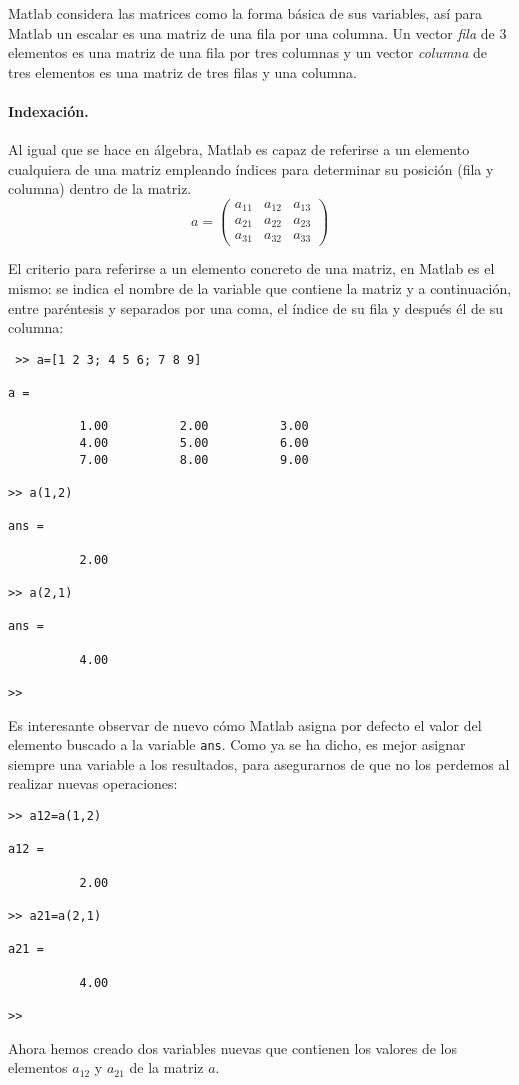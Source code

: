 Matlab considera las matrices como la forma básica de sus variables, así para Matlab un escalar es una matriz de una fila por una columna. Un vector \emph{fila} de 3 elementos es una matriz de una fila por tres columnas y un vector \emph{columna} de tres elementos es una matriz de tres filas y una columna.

\paragraph*{Indexación.} Al igual que se hace en álgebra, Matlab es capaz de referirse a un elemento cualquiera de una matriz empleando índices para determinar su posición (fila y columna) dentro de la matriz.
\begin{equation*}
a=
\begin{pmatrix}
a_{11}&a_{12}&a_{13}\\
a_{21}&a_{22}&a_{23}\\
a_{31}&a_{32}&a_{33}
\end{pmatrix}
\end{equation*}

El criterio para referirse a un elemento concreto de una matriz, en Matlab es el mismo: se indica el nombre de la variable que contiene la matriz y a continuación, entre paréntesis y separados por una coma, el índice de su fila y después él de su columna:
 \begin{verbatim}
 >> a=[1 2 3; 4 5 6; 7 8 9]

a =

          1.00          2.00          3.00
          4.00          5.00          6.00
          7.00          8.00          9.00

>> a(1,2)

ans =

          2.00

>> a(2,1)

ans =

          4.00

>> 
 \end{verbatim}
 
Es interesante observar de nuevo cómo Matlab asigna por defecto el valor del elemento buscado a la variable \texttt{ans}. Como ya se ha dicho, es mejor asignar siempre una variable a los resultados, para asegurarnos de que no los perdemos al realizar nuevas operaciones:
\begin{verbatim}
>> a12=a(1,2)

a12 =

          2.00

>> a21=a(2,1)

a21 =

          4.00

>> 
\end{verbatim}
Ahora hemos creado dos variables nuevas que contienen los valores de los elementos $a_{12}$ y $a_{21}$ de la matriz $a$. 

